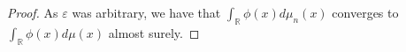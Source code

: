 \documentclass[12pt,a4paper,leqno]{report}
\newcommand{\R}{\mathbb{R}}
\newcommand{\eps}{\varepsilon}
\theoremstyle{plain}
\theoremstyle{definition}
\theoremstyle{remark}
\begin{document}
\begin{proof}
As $\eps$ was arbitrary, we have that 
$\int_{\R} \phi(x) d\mu_n(x)$ converges to $\int_{\R} \phi(x) d\mu(x)$ almost surely.
%
%
%
%
%
%

\end{proof}
\end{document}
